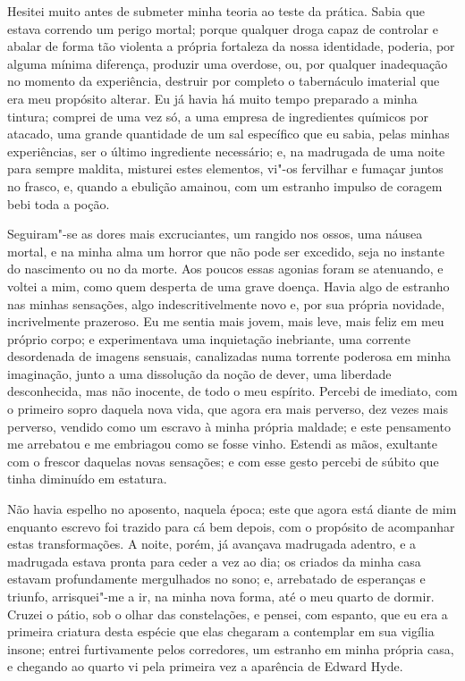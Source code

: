 Hesitei muito antes de submeter minha teoria ao teste da prática.  Sabia
que estava correndo um perigo mortal; porque qualquer droga capaz de
controlar e abalar de forma tão violenta a própria fortaleza da nossa
identidade, poderia, por alguma mínima diferença, produzir uma
overdose, ou, por qualquer inadequação no momento da experiência,
destruir por completo o tabernáculo imaterial que era meu propósito
alterar.  Eu já havia há muito tempo preparado a minha tintura; comprei
de uma vez só, a uma empresa de ingredientes químicos por atacado, uma
grande quantidade de um sal específico que eu sabia, pelas minhas
experiências, ser o último ingrediente necessário; e, na madrugada de
uma noite para sempre maldita, misturei estes elementos, vi"-os
fervilhar e fumaçar juntos no frasco, e, quando a ebulição amainou, com
um estranho impulso de coragem bebi toda a poção.

Seguiram"-se as dores mais excruciantes, um rangido nos ossos, uma náusea
mortal, e na minha alma um horror que não pode ser excedido, seja no
instante do nascimento ou no da morte.  Aos poucos essas agonias foram
se atenuando, e voltei a mim, como quem desperta de uma grave doença. 
Havia algo de estranho nas minhas sensações, algo indescritivelmente
novo e, por sua própria novidade, incrivelmente prazeroso.  Eu me
sentia mais jovem, mais leve, mais feliz em meu próprio corpo; e
experimentava uma inquietação inebriante, uma corrente desordenada de
imagens sensuais, canalizadas numa torrente poderosa em minha
imaginação, junto a uma dissolução da noção de dever, uma liberdade
desconhecida, mas não inocente, de todo o meu espírito.  Percebi de
imediato, com o primeiro sopro daquela nova vida, que agora era mais
perverso, dez vezes mais perverso, vendido como um escravo à minha
própria maldade; e este pensamento me arrebatou e me embriagou como se
fosse vinho.  Estendi as mãos, exultante com o frescor daquelas novas
sensações; e com esse gesto percebi de súbito que tinha diminuído em
estatura.

Não havia espelho no aposento, naquela época; este que agora está diante
de mim enquanto escrevo foi trazido para cá bem depois, com o propósito
de acompanhar estas transformações.  A noite, porém, já avançava
madrugada adentro, e a madrugada estava pronta para ceder a vez ao dia;
os criados da minha casa estavam profundamente mergulhados no sono; e,
arrebatado de esperanças e triunfo, arrisquei"-me a ir, na minha nova
forma, até o meu quarto de dormir.  Cruzei o pátio, sob o olhar das
constelações, e pensei, com espanto, que eu era a primeira criatura
desta espécie que elas chegaram a contemplar em sua vigília insone;
entrei furtivamente pelos corredores, um estranho em minha própria
casa, e chegando ao quarto vi pela primeira vez a aparência de Edward
Hyde.

